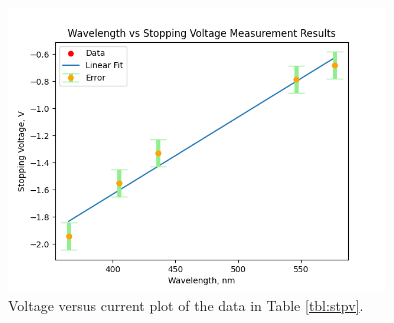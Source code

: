 	
		\begin{figure}[H]
			\centering
			\includegraphics[width=10cm]{images/plot2_pe.png}
			\caption{Voltage versus current plot of the data in Table \ref{tbl:stpv}.}
			\label{fig:plt2}
		\end{figure}
		
	